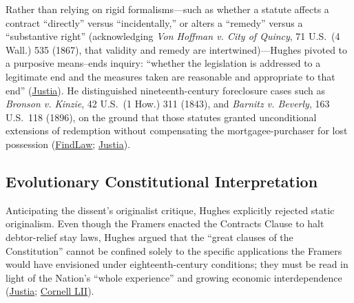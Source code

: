 \documentclass[12pt]{article}
\begin{document}
Rather than relying on rigid formalisms---such as whether a statute affects a contract ``directly'' versus ``incidentally,'' or alters a ``remedy'' versus a ``substantive right'' (acknowledging \emph{Von Hoffman v. City of Quincy}, 71 U.S.\ (4 Wall.) 535 (1867), that validity and remedy are intertwined)---Hughes pivoted to a purposive means--ends inquiry: ``whether the legislation is addressed to a legitimate end and the measures taken are reasonable and appropriate to that end'' (\href{https://supreme.justia.com/cases/federal/us/290/398/}{Justia}). He distinguished nineteenth-century foreclosure cases such as \emph{Bronson v. Kinzie}, 42 U.S.\ (1 How.) 311 (1843), and \emph{Barnitz v. Beverly}, 163 U.S.\ 118 (1896), on the ground that those statutes granted unconditional extensions of redemption without compensating the mortgagee-purchaser for lost possession (\href{https://caselaw.findlaw.com/court/us-supreme-court/290/398.html}{FindLaw}; \href{https://supreme.justia.com/cases/federal/us/290/398/}{Justia}).

\subsection{Evolutionary Constitutional Interpretation}
Anticipating the dissent's originalist critique, Hughes explicitly rejected static originalism. Even though the Framers enacted the Contracts Clause to halt debtor-relief stay laws, Hughes argued that the ``great clauses of the Constitution'' cannot be confined solely to the specific applications the Framers would have envisioned under eighteenth-century conditions; they must be read in light of the Nation's ``whole experience'' and growing economic interdependence (\href{https://supreme.justia.com/cases/federal/us/290/398/}{Justia}; \href{https://www.law.cornell.edu/constitution-conan/article-1/section-10/clause-1/blaisdell-case-and-state-modifications-to-private-contracts}{Cornell LII}).
\end{document}
